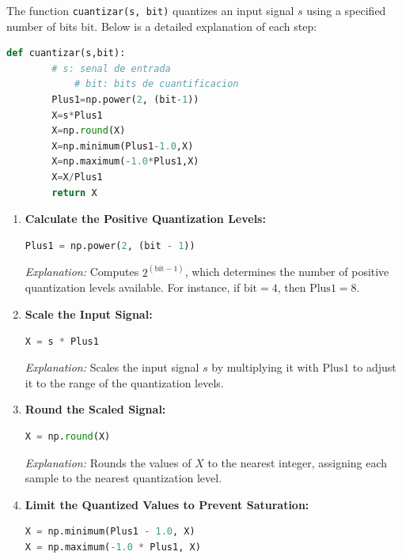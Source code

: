 \documentclass[10pt]{article}
\theoremstyle{definition}
\theoremstyle{remark}
\theoremstyle{definition}
\numberwithin{equation}{prob}
\begin{document}
The function \texttt{cuantizar(s, bit)} quantizes an input signal \( s \) using a specified number of bits \( \text{bit} \). Below is a detailed explanation of each step:

\begin{lstlisting}[language=Python]
	def cuantizar(s,bit):
		# s: senal de entrada
        	# bit: bits de cuantificacion
		Plus1=np.power(2, (bit-1))
		X=s*Plus1
		X=np.round(X)
		X=np.minimum(Plus1-1.0,X)
		X=np.maximum(-1.0*Plus1,X)
		X=X/Plus1
		return X
		\end{lstlisting}

\begin{enumerate}
    \item \textbf{Calculate the Positive Quantization Levels:}

    \begin{lstlisting}[language=Python]
Plus1 = np.power(2, (bit - 1))
    \end{lstlisting}

    \textit{Explanation:} Computes \( 2^{(\text{bit} - 1)} \), which determines the number of positive quantization levels available. For instance, if \( \text{bit} = 4 \), then \( \text{Plus1} = 8 \).

    \item \textbf{Scale the Input Signal:}

    \begin{lstlisting}[language=Python]
X = s * Plus1
    \end{lstlisting}

    \textit{Explanation:} Scales the input signal \( s \) by multiplying it with \( \text{Plus1} \) to adjust it to the range of the quantization levels.

    \item \textbf{Round the Scaled Signal:}

    \begin{lstlisting}[language=Python]
X = np.round(X)
    \end{lstlisting}

    \textit{Explanation:} Rounds the values of \( X \) to the nearest integer, assigning each sample to the nearest quantization level.

    \item \textbf{Limit the Quantized Values to Prevent Saturation:}

    \begin{lstlisting}[language=Python]
X = np.minimum(Plus1 - 1.0, X)
X = np.maximum(-1.0 * Plus1, X)
    \end{lstlisting}


\end{enumerate}
\end{document}
